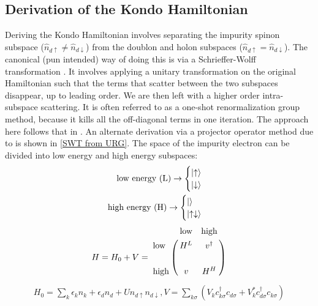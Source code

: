 \subsection{Derivation of the Kondo Hamiltonian}
Deriving the Kondo Hamiltonian involves separating the impurity spinon subspace (\(\hat n_{d\uparrow} \neq \hat n_{d\downarrow}\)) from the doublon and holon subspaces (\(\hat n_{d\uparrow} = \hat n_{d\downarrow}\)). The canonical (pun intended) way of doing this is via a Schrieffer-Wolff transformation \cite{schrieffer1966}. It involves applying a unitary transformation on the original Hamiltonian such that the terms that scatter between the two subspaces disappear, up to leading order. We are then left with a higher order intra-subspace scattering. It is often referred to as a one-shot renormalization group method, because it kills all the off-diagonal terms in one iteration. The approach here follows that in \cite{piers}. An alternate derivation via a projector operator method due to \cite{hewson} is shown in \ref{SWT from URG}.
The space of the impurity electron can be divided into low energy and high energy subspaces:
\begin{equation}\begin{aligned}
\text{low energy (L)} \rightarrow \begin{cases} \ket{\uparrow} \\ \ket{\downarrow} \end{cases}\\
\text{high energy (H)} \rightarrow \begin{cases} \ket{} \\ \ket{\uparrow\downarrow} \end{cases}\\
\end{aligned}\end{equation}
\begin{equation}\begin{aligned}
H = H_0 + V = \bordermatrix{~ & \text{low} & \text{high} \cr 
\text{low} & H^L & v^\dagger \cr
       &&\cr
\text{high} & v & H^H }
\end{aligned}\end{equation}
\begin{equation}\begin{aligned}
	H_0 = \sum_{k}\epsilon_k n_{k}+ \epsilon_d n_d + U n_{d\uparrow}n_{d\downarrow}, V=\sum_{k\sigma}\left(V_k c^\dagger_{k\sigma}c_{d\sigma} +V_k^* c^\dagger_{d\sigma}c_{k\sigma}\right)
\end{aligned}\end{equation}
